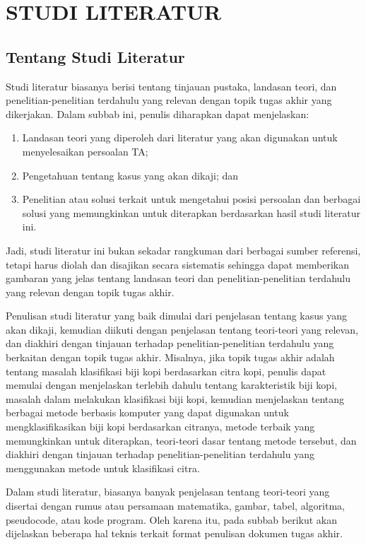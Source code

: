 \cleardoublepage %
\chapter{STUDI LITERATUR}
\label{chap:studiliteratur}
\section{Tentang Studi Literatur}
Studi literatur biasanya berisi tentang tinjauan pustaka, landasan teori, dan penelitian-penelitian terdahulu yang relevan dengan topik tugas akhir yang dikerjakan.
Dalam subbab ini, penulis diharapkan dapat menjelaskan:
\begin{enumerate}
  \item Landasan teori yang diperoleh dari literatur yang akan digunakan untuk menyelesaikan persoalan TA;
  \item Pengetahuan tentang kasus yang akan dikaji; dan
  \item Penelitian atau solusi terkait untuk mengetahui posisi persoalan dan berbagai solusi yang memungkinkan untuk diterapkan berdasarkan hasil studi literatur ini.
\end{enumerate}
Jadi, studi literatur ini bukan sekadar rangkuman dari berbagai sumber referensi, tetapi harus diolah dan disajikan secara sistematis sehingga dapat memberikan gambaran yang jelas tentang landasan teori dan penelitian-penelitian terdahulu yang relevan dengan topik tugas akhir.

Penulisan studi literatur yang baik dimulai dari penjelasan tentang kasus yang akan dikaji, kemudian diikuti dengan penjelasan tentang teori-teori yang relevan, dan diakhiri dengan tinjauan terhadap penelitian-penelitian terdahulu yang berkaitan dengan topik tugas akhir.
Misalnya, jika topik tugas akhir adalah tentang masalah klasifikasi biji kopi berdasarkan citra kopi, 
penulis dapat memulai dengan menjelaskan terlebih dahulu tentang karakteristik biji kopi, masalah dalam melakukan klasifikasi biji kopi, 
kemudian menjelaskan tentang berbagai metode berbasis komputer yang dapat digunakan untuk mengklasifikasikan biji kopi berdasarkan citranya, 
metode terbaik yang memungkinkan untuk diterapkan, teori-teori dasar tentang metode tersebut, dan diakhiri dengan tinjauan terhadap penelitian-penelitian terdahulu yang menggunakan metode untuk klasifikasi citra.

Dalam studi literatur, biasanya banyak penjelasan tentang teori-teori yang disertai dengan rumus atau persamaan matematika, gambar, tabel, algoritma, pseudocode, atau kode program.
Oleh karena itu, pada subbab berikut akan dijelaskan beberapa hal teknis terkait format penulisan dokumen tugas akhir.

